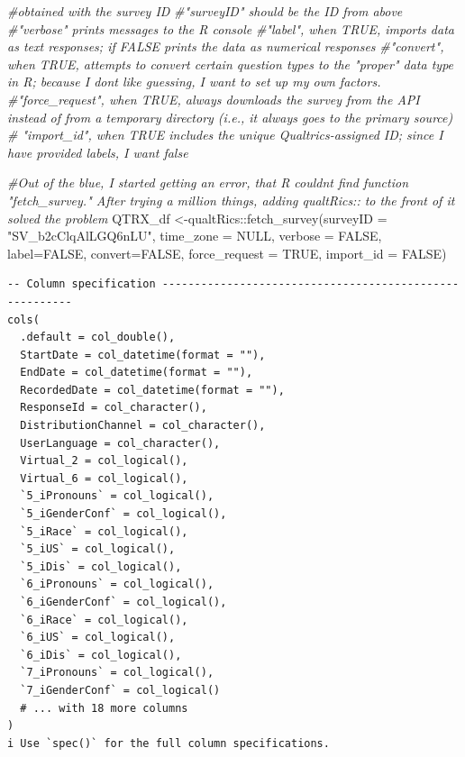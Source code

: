 \documentclass[
  english,
]{book}
\newenvironment{Shaded}{\begin{snugshade}}{\end{snugshade}}
\newcommand{\AttributeTok}[1]{\textcolor[rgb]{0.77,0.63,0.00}{#1}}
\newcommand{\CommentTok}[1]{\textcolor[rgb]{0.56,0.35,0.01}{\textit{#1}}}
\newcommand{\ConstantTok}[1]{\textcolor[rgb]{0.00,0.00,0.00}{#1}}
\newcommand{\FunctionTok}[1]{\textcolor[rgb]{0.00,0.00,0.00}{#1}}
\newcommand{\NormalTok}[1]{#1}
\newcommand{\OtherTok}[1]{\textcolor[rgb]{0.56,0.35,0.01}{#1}}
\newcommand{\SpecialCharTok}[1]{\textcolor[rgb]{0.00,0.00,0.00}{#1}}
\newcommand{\StringTok}[1]{\textcolor[rgb]{0.31,0.60,0.02}{#1}}
\begin{document}
\begin{Shaded}
\begin{Highlighting}[]
\CommentTok{\#obtained with the survey ID }
\CommentTok{\#"surveyID" should be the ID from above}
\CommentTok{\#"verbose" prints messages to the R console}
\CommentTok{\#"label", when TRUE, imports data as text responses; if FALSE prints the data as numerical responses}
\CommentTok{\#"convert", when TRUE, attempts to convert certain question types to the "proper" data type in R; because I don\textquotesingle{}t like guessing, I want to set up my own factors.}
\CommentTok{\#"force\_request", when TRUE, always downloads the survey from the API instead of from a temporary directory (i.e., it always goes to the primary source)}
\CommentTok{\# "import\_id", when TRUE includes the unique Qualtrics{-}assigned ID; since I have provided labels, I want false}

\CommentTok{\#Out of the blue, I started getting an error, that R couldn\textquotesingle{}t find function "fetch\_survey."  After trying a million things, adding qualtRics:: to the front of it solved the problem}
\NormalTok{QTRX\_df }\OtherTok{\textless{}{-}}\NormalTok{qualtRics}\SpecialCharTok{::}\FunctionTok{fetch\_survey}\NormalTok{(}\AttributeTok{surveyID =} \StringTok{"SV\_b2cClqAlLGQ6nLU"}\NormalTok{, }\AttributeTok{time\_zone =} \ConstantTok{NULL}\NormalTok{, }\AttributeTok{verbose =} \ConstantTok{FALSE}\NormalTok{, }\AttributeTok{label=}\ConstantTok{FALSE}\NormalTok{, }\AttributeTok{convert=}\ConstantTok{FALSE}\NormalTok{, }\AttributeTok{force\_request =} \ConstantTok{TRUE}\NormalTok{, }\AttributeTok{import\_id =} \ConstantTok{FALSE}\NormalTok{)}
\end{Highlighting}
\end{Shaded}

\begin{verbatim}
-- Column specification --------------------------------------------------------
cols(
  .default = col_double(),
  StartDate = col_datetime(format = ""),
  EndDate = col_datetime(format = ""),
  RecordedDate = col_datetime(format = ""),
  ResponseId = col_character(),
  DistributionChannel = col_character(),
  UserLanguage = col_character(),
  Virtual_2 = col_logical(),
  Virtual_6 = col_logical(),
  `5_iPronouns` = col_logical(),
  `5_iGenderConf` = col_logical(),
  `5_iRace` = col_logical(),
  `5_iUS` = col_logical(),
  `5_iDis` = col_logical(),
  `6_iPronouns` = col_logical(),
  `6_iGenderConf` = col_logical(),
  `6_iRace` = col_logical(),
  `6_iUS` = col_logical(),
  `6_iDis` = col_logical(),
  `7_iPronouns` = col_logical(),
  `7_iGenderConf` = col_logical()
  # ... with 18 more columns
)
i Use `spec()` for the full column specifications.
\end{verbatim}
\end{document}

